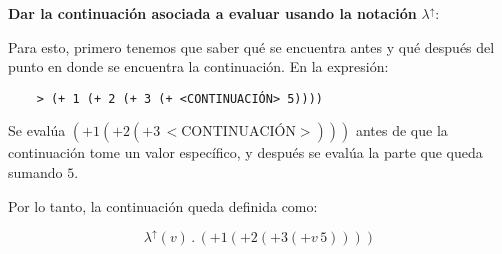 \textbf{Dar la continuación asociada a evaluar usando la notación} \(\lambda^\uparrow\):

Para esto, primero tenemos que saber qué se encuentra antes y qué después del punto en donde se encuentra la continuación. En la expresión:

\begin{verbatim}
    > (+ 1 (+ 2 (+ 3 (+ <CONTINUACIÓN> 5))))
\end{verbatim}

Se evalúa \((+1 (+2 (+3 \, <\text{CONTINUACIÓN}>)))\) antes de que la continuación tome un valor específico, y después se evalúa la parte que queda sumando \(5\). 

Por lo tanto, la continuación queda definida como:

\[
\lambda^\uparrow (v) \, . \, (+ 1 (+ 2 (+ 3 (+ v \, 5))))
\]
